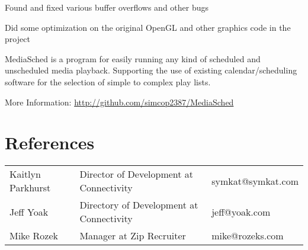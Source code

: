 \documentclass[table,tmargin=1in,bmargin=1in,letterpaper]{resume}
\begin{document}

\begin{compactitem}
\item Found and fixed various buffer overflows and other bugs
\item Did some optimization on the original OpenGL and other graphics code in the project
\end{compactitem}


\begin{compactitem}
\item MediaSched is a program for easily running any kind of scheduled and unscheduled media playback.  Supporting the use of existing calendar/scheduling software for the selection of simple to complex play lists.
\item More Information: \url{http://github.com/simcop2387/MediaSched}
\end{compactitem}

\section{References}
\begin{tabular}{lll}
\rowcolor{white} Kaitlyn Parkhurst & Director of Development at Connectivity & symkat@symkat.com \\
\rowcolor{lightgray} Jeff Yoak & Directory of Development at Connectivity & jeff@yoak.com \\
\rowcolor{white} Mike Rozek & Manager at Zip Recruiter & mike@rozeks.com
\end{tabular}
\end{document}
